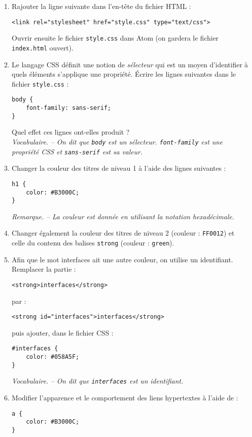 \documentclass[a4paper]{article}
\begin{document}
\activite
\begin{enumerate}
  \item Rajouter la ligne suivante dans l'en-tête du fichier HTML :
    \begin{verbatim}
<link rel="stylesheet" href="style.css" type="text/css">
    \end{verbatim}
    Ouvrir ensuite le fichier \verb|style.css| dans Atom (on gardera le fichier \verb|index.html| ouvert).
  \item Le langage CSS définit une notion de \textit{sélecteur} qui est un moyen d'identifier à quels éléments s'applique une propriété. Écrire les lignes suivantes dans le fichier \verb|style.css| :
    \begin{verbatim}
body {
    font-family: sans-serif;
}
    \end{verbatim}
    Quel effet ces lignes ont-elles produit ?\\
    \textit{Vocabulaire. -- On dit que \texttt{body} est un sélecteur. \texttt{font-family} est une propriété CSS et \texttt{sans-serif} est sa valeur.}
  \item Changer la couleur des titres de niveau 1 à l'aide des lignes suivantes :
    \begin{verbatim}
h1 {
    color: #B3000C;
}
    \end{verbatim}
    \textit{Remarque. -- La couleur est donnée en utilisant la notation hexadécimale.}
  \item Changer également la couleur des titres de niveau 2 (couleur : \texttt{FF0012}) et celle du contenu des balises \texttt{strong} (couleur : \texttt{green}).
  \item Afin que le mot \og{}interfaces\fg{} ait une autre couleur, on utilise un identifiant. Remplacer la partie :

    \begin{verbatim}
<strong>interfaces</strong>
    \end{verbatim}

    par : 

    \begin{verbatim}
<strong id="interfaces">interfaces</strong>
    \end{verbatim}

    puis ajouter, dans le fichier CSS :
    \begin{verbatim}
#interfaces {
    color: #058A5F;
}
    \end{verbatim}
    \textit{Vocabulaire. -- On dit que \texttt{interfaces} est un identifiant.}
  \item Modifier l'apparence et le comportement des liens hypertextes à l'aide de :
    \begin{verbatim}
a {
    color: #B3000C;
}
    \end{verbatim}


\end{enumerate}
\end{document}
